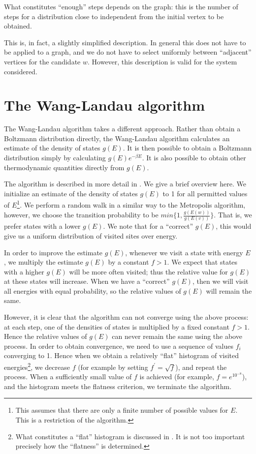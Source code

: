 \documentclass{article}
\begin{document}
What constitutes ``enough'' steps depends on the graph: this is the number of steps for a distribution close to independent from the initial vertex to be obtained.

This is, in fact, a slightly simplified description.
In general this does not have to be applied to a graph, and we do not have to select uniformly between ``adjacent'' vertices for the candidate $w$.
However, this description is valid for the system considered.

\section{The Wang-Landau algorithm}
The Wang-Landau algorithm takes a different approach.
Rather than obtain a Boltzmann distribution directly, the Wang-Landau algorithm calculates an estimate of the density of states $g(E)$.
It is then possible to obtain a Boltzmann distribution simply by calculating $g(E)e^{-\beta E}$.
It is also possible to obtain other thermodynamic quantities directly from $g(E)$.

The algorithm is described in more detail in \cite{WangLandau}.
We give a brief overview here.
We initialize an estimate of the density of states $g(E)$ to 1 for all permitted values of $E$\footnote{This assumes that there are only a finite number of possible values for $E$. This is a restriction of the algorithm.}.
We perform a random walk in a similar way to the Metropolis algorithm, however, we choose the transition probability to be $min\{1, \frac{g(E(w))}{g(E(v))}\}$.
That is, we prefer states with a lower $g(E)$.
We note that for a ``correct'' $g(E)$, this would give us a uniform distribution of visited sites over energy.

In order to improve the estimate $g(E)$, whenever we visit a state with energy $E$, we multiply the estimate $g(E)$ by a constant $f>1$.
We expect that states with a higher $g(E)$ will be more often visited; thus the relative value for $g(E)$ at these states will increase.
When we have a ``correct'' $g(E)$, then we will visit all energies with equal probability, so the relative values of $g(E)$ will remain the same.

However, it is clear that the algorithm can not converge using the above process: at each step, one of the densities of states is multiplied by a fixed constant $f>1$.
Hence the relative values of $g(E)$ can never remain the same using the above process.
In order to obtain convergence, we need to use a sequence of values $f_i$ converging to 1.
Hence when we obtain a relatively ``flat'' histogram of visited energies\footnote{What constitutes a ``flat'' histogram is discussed in \cite{WangLandau}. It is not too important precisely how the ``flatness'' is determined.}, we decrease $f$ (for example by setting $f^\prime = \sqrt{f}$), and repeat the process.
When a sufficiently small value of $f$ is achieved (for example, $f = e^{10^{-8}}$), and the histogram meets the flatness criterion, we terminate the algorithm.
\end{document}
